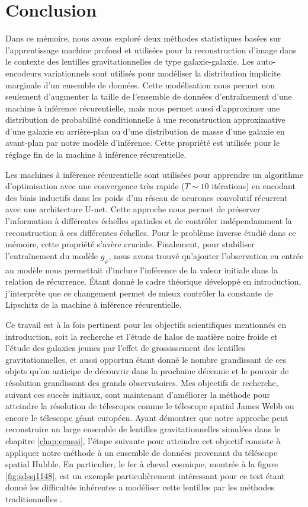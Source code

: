 \chapter{Conclusion}
Dans ce mémoire, nous avons exploré deux méthodes statistiques basées sur l'apprentissage machine profond et
utilisées pour la reconstruction d'image dans le contexte des lentilles gravitationnelles de type galaxie-galaxie.
Les auto-encodeurs variationnels sont utilisés pour modéliser la distribution implicite marginale d'un 
ensemble de données. Cette modélisation nous permet non seulement d'augmenter la taille de l'ensemble 
de données d'entraînement d'une machine à inférence récurentielle, mais nous permet aussi d'approximer 
une distribution de probabilité conditionnelle à une reconstruction approximative d'une galaxie 
en arrière-plan ou d'une distribution de masse d'une galaxie en avant-plan par notre modèle d'inférence. 
Cette propriété est utilisée pour le réglage fin de la machine à inférence récurentielle.

Les machines à inférence récurentielle sont utilisées pour apprendre un algorithme d'optimisation avec une convergence 
très rapide ($T \sim 10$ itérations)
en encodant des biais inductifs dans les poids d'un réseau de neurones convolutif récurrent avec une architecture U-net. 
Cette approche nous permet de préserver l'information à différentes échelles spatiales et de contrôler indépendamment 
la reconstruction à ces différentes échelles. Pour le problème inverse étudié dans ce mémoire, cette propriété s'avère cruciale. 
Finalement, pour stabiliser l'entraînement du modèle $g_\varphi$, nous avons trouvé qu'ajouter l'observation 
en entrée au modèle nous permettait d'inclure l'inférence de la valeur initiale dans la relation de récurrence. Étant 
donné le cadre théorique développé en introduction, j'interprète que ce changement permet de mieux contrôler la constante de
Lipschitz de la machine à inférence récurentielle.

Ce travail est à la fois pertinent pour les objectifs scientifiques mentionnés en introduction, soit la recherche et l'étude 
de halos de matière noire froide et l'étude des galaxies jeunes par l'effet de grossissement des lentilles gravitationnelles, 
et aussi opportun étant donné le nombre grandissant de ces objets qu'on anticipe de découvrir dans la prochaine décennie et 
le pouvoir de résolution grandissant des grands observatoires. Mes objectifs de recherche, suivant ces succès initiaux, sont maintenant 
d'améliorer la méthode pour atteindre la résolution de télescopes comme le télescope spatial James Webb ou encore le télescope 
géant européen. Ayant démontrer que notre approche peut reconstruire un large ensemble de lentilles 
gravitationnelles simulées dans le chapitre \ref{chap:censai}, l'étape suivante pour atteindre cet objectif consiste 
à appliquer notre 
méthode à un ensemble de données provenant du téléscope spatial Hubble. En particulier,
le fer à cheval cosmique, montrée à la figure \ref{fig:sdssj1148}, est un exemple 
particulièrement intéressant pour ce test étant donné les difficultés inhérentes a modéliser 
cette lentilles par les méthodes traditionnelles \citep{James2018,Schuldt2019,Cheng2019}.

